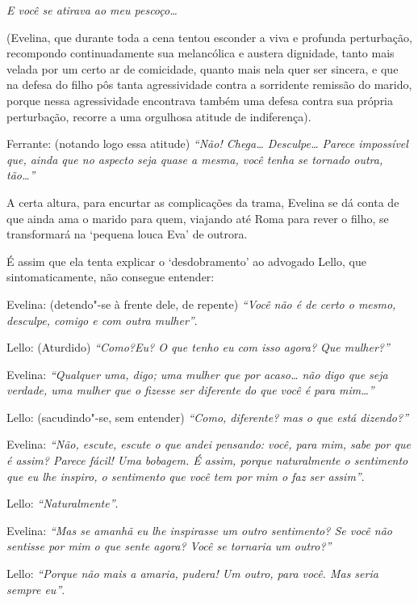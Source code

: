 \emph{E você se atirava ao meu pescoço\ldots{}}

(Evelina, que durante toda a cena tentou esconder a viva e profunda
perturbação, recompondo continuadamente sua melancólica e austera
dignidade, tanto mais velada por um certo ar de comicidade, quanto mais
nela quer ser sincera, e que na defesa do filho pôs tanta agressividade
contra a sorridente remissão do marido, porque nessa agressividade
encontrava também uma defesa contra sua própria perturbação, recorre a
uma orgulhosa atitude de indiferença).

Ferrante: (notando logo essa atitude) \emph{``Não! Chega\ldots{} Desculpe\ldots{}
Parece impossível que, ainda que no aspecto seja quase a mesma, você
tenha se tornado outra, tão\ldots{}''}

A certa altura, para encurtar as complicações da trama, Evelina se dá
conta de que ainda ama o marido para quem, viajando até Roma para rever
o filho, se transformará na `pequena louca Eva' de outrora.

É assim que ela tenta explicar o `desdobramento' ao advogado Lello, que
sintomaticamente, não consegue entender:

Evelina: (detendo"-se à frente dele, de repente) \emph{``Você não é de
certo o mesmo, desculpe, comigo e com outra mulher''}.

Lello: (Aturdido) \emph{``Como?Eu? O que tenho eu com isso agora? Que
mulher?''}

Evelina: \emph{``Qualquer uma, digo; uma mulher que por acaso\ldots{} não digo
que seja verdade, uma mulher que o fizesse ser diferente do que você é
para mim\ldots{}''}

Lello: (sacudindo"-se, sem entender) \emph{``Como, diferente? mas o que
está dizendo?''}

Evelina: \emph{``Não, escute, escute o que andei pensando: você,
para mim, sabe por que é assim? Parece fácil! Uma bobagem. É assim,
porque naturalmente o sentimento que eu lhe inspiro, o sentimento que
você tem por mim o faz ser assim''}.

Lello: \emph{``Naturalmente''}.

Evelina: \emph{``Mas se amanhã eu lhe inspirasse um outro sentimento? Se
você não sentisse por mim o que sente agora? Você se tornaria um outro?''}

Lello: \emph{``Porque não mais a amaria, pudera! Um outro, para você. Mas
seria sempre eu''}.

